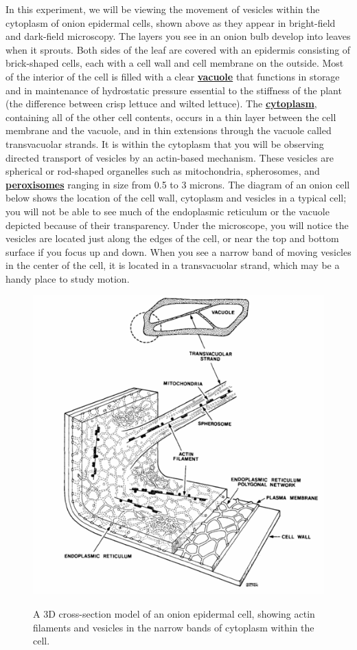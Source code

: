 \documentclass{../lab}
\begin{document}
In this experiment, we will be viewing the movement of vesicles within the cytoplasm of onion epidermal cells, shown above as they appear in bright-field and dark-field microscopy. The layers you see in an onion bulb develop into leaves when it sprouts. Both sides of the leaf are covered with an epidermis consisting of brick-shaped cells, each with a cell wall and cell membrane on the outside. Most of the interior of the cell is filled with a clear \href{http://physics111.lib.berkeley.edu/Physics111/Reprints/OTZ/biowikipedia.pdf}{\textbf{vacuole}} that functions in storage and in maintenance of hydrostatic pressure essential to the stiffness of the plant (the difference between crisp lettuce and wilted lettuce). The \href{http://physics111.lib.berkeley.edu/Physics111/Reprints/OTZ/biowikipedia.pdf}{\textbf{cytoplasm}}, containing all of the other cell contents, occurs in a thin layer between the cell membrane and the vacuole, and in thin extensions through the vacuole called transvacuolar strands. It is within the cytoplasm that you will be observing directed transport of vesicles by an actin-based mechanism. These vesicles are spherical or rod-shaped organelles such as mitochondria, spherosomes, and \href{http://physics111.lib.berkeley.edu/Physics111/Reprints/OTZ/biowikipedia.pdf}{\textbf{peroxisomes}} ranging in size from 0.5 to 3 microns. The diagram of an onion cell below shows the location of the cell wall, cytoplasm and vesicles in a typical cell; you will not be able to see much of the endoplasmic reticulum or the vacuole depicted because of their transparency. Under the microscope, you will notice the vesicles are located just along the edges of the cell, or near the top and bottom surface if you focus up and down. When you see a narrow band of moving vesicles in the center of the cell, it is located in a transvacuolar strand, which may be a handy place to study motion.

\begin{figure}[h]
    \centering
    \href{http://experimentationlab.berkeley.edu/sites/default/files/images/500px-BMC_OnionStucture.gif}{\includegraphics[width=0.5\linewidth]{images/500px-BMC_OnionStucture.png}}
    \caption{A 3D cross-section model of an onion epidermal cell, showing actin filaments and vesicles in the narrow bands of cytoplasm within the cell.}
    \label{fig:500px-BMC_OnionStucture}
\end{figure}
\end{document}
